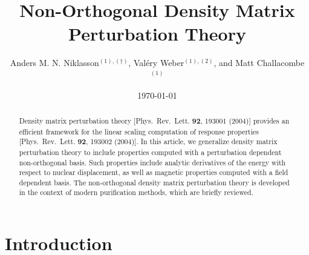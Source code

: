 \documentclass[twocolumn,showpacs,preprintnumbers,amsmath,amssymb]{revtex4}
\begin{document}

\title{Non-Orthogonal Density Matrix Perturbation Theory}

\author{Anders M. N. Niklasson$^{(1),(\dagger)}$, Val\'ery Weber$^{(1),(2)}$, and Matt Challacombe$^{(1)}$}


\date{\today}

\begin{abstract}
Density matrix perturbation theory [Phys.\ Rev.\ Lett.  {\bf 92}, 193001 (2004)]
provides an efficient framework for the linear scaling computation of response properties
[Phys.\ Rev.\ Lett.  {\bf 92}, 193002 (2004)].  In this article, we generalize density matrix 
perturbation theory to include properties computed with a perturbation dependent non-orthogonal 
basis.  Such properties include analytic derivatives of the energy with 
respect to nuclear displacement, as well as magnetic 
properties computed with a field dependent basis.  The non-orthogonal density matrix 
perturbation theory is developed in the context of modern purification methods, which are 
briefly reviewed.
\end{abstract}

\maketitle

\section{Introduction}
\end{document}
